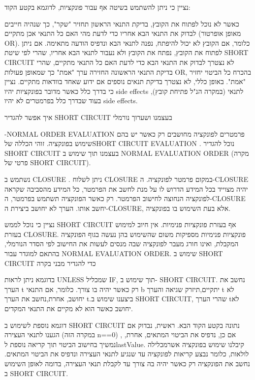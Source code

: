         נציין כי ניתן להשתמש בשיטה אף עבור פונקציות, לדוגמא בקטע הקוד:

        כאשר לא נוכל לפתוח את הקובץ, בדיקת התנאי הראשון תחזיר "שקר", כך שנהיה חייבים
        לבדוק את התנאי הבא אחריו כדי לדעת מהי האם כל התנאי אכן מתקיים (מאופן אופרטור
        OR). כלומר, אם הקובץ לא יכול להיפתח, נפנה לתנאי הבא ונדפיס הודעה מתאימה. אם
        ניתן לפתוח את הקובץ, נפתח את הקובץ ולא נעבור לתנאי הבא אחריו, שהרי לפי שיטת
        SHORT CIRCUIT לא נצטרך לבדוק את התנאי הבא כדי לדעת האם כל התנאי מתקיים, שהרי
        בדיקת התנאי הראשונה החזירה ערך "אמת" כך שמאופן פעולות OR, בהכרח כל הביטוי
        יחזיר "אמת". באופן כללי, לא נצטרך בדיקת תנאים נוספים אם ידוע שאחד בוודאות
        מתקיים. נציין כי בדרך כלל כאשר מדובר בפונקציות יהיו side effects לתנאי
        (במקרה הנ"ל פתיחת קובץ), בעוד שבדרך כלל בפרמטרים לא יהיו side effects.

        איך אפשר להגדיר SHORT CIRCUIT בעצמנו ושערוך נורמלי

        -NORMAL ORDER EVALUATION פרמטרים לפונקציה מחושבים רק כאשר יש בהם שימוש
        בפונקציה. זוהי הכללה שלSHORT CIRCUIT EVALUATION . נוכל להגדיר SHORT CIRCUIT
        בעצמנו תוך שימוש ב NORMAL EVALUATION ORDER (מקרה פרטי של SHORT CIRCUIT).

        נשתמש ב CLOSURE . ניתן לשלוח CLOSURE במקום פרמטר לפונקציה. ה-CLOSURE יהיה
        מצוייד בכל המידע הדרוש לו על מנת לחשב את הפרמטר, כל המידע מהסביבה שקראה
        לפונקציה הנחוצה לחישוב הפרמטר. רק כאשר הפונקציה תשתמש בפרמטר, ה-CLOSURE יחשב
        אותו. הערך לא יחושב ביצירת ה-CLOSURE, אלא בעת השימוש בו בפונקציה.

        נציין כי נוכל לממש SHORT CIRCUIT אף בעזרת פונקציות פנימיות. אין חיוב למימוש
        בעזרת CLOSURE. פונקציות פנימיות מספיקות משום שהשימוש בהן נעשה בגוף הפונקציה
        המקבלת, ואינו חורג מעבר לפונקציה שבה מנסים לעשות את החישוב לפי הסדר הנורמלי,
        בהתאם למוגדר עבור NORMAL EVALUATION ORDER. שימוש ב SHORT CIRCUIT כדי להגדיר
        מבני בקרה

        בדוגמא ניתן לראות UNLESS שמכליל IF, תוך שימוש ב- SHORT CIRCUIT. נחשב את הערך
        t רק כאשר יהיה בו צורך. כלומר, אם התנאי b יתקיים,תיזרק שגיאה והערך t לא יחושב,
        אחרת,נחשב את הערך t.ביצענו שימוש ב SHORT CIRCUIT, שהרי הערך tלא יחושב כאשר הוא
        לא מקיים את התנאי המקדים.

        דוגמא נוספת לשימוש ב SHORT CIRCUIT נתונה בקטע הקוד הבא. ראשית, נבדוק אם הגענו
        לתנאי העצירה (במקרה הזה n==0) , אם כן, נדפיס את הביטוי המתאים, אחרת, נמשיך
        בחישוב הביטוי תוך קריאה נוספת לlastValue. קיבלנו שימוש בפונקציה אשרמכלילה
        לולאות, כלומר נבצע קריאות לפונקציה עד שנגיע לתנאי העצירה ונדפיס את הביטוי
        המתאים. נחשב את הפונקציה רק כאשר יהיה בה צורך עד לקבלת תנאי העצירה, בדומה לאופן
        השימוש ב SHORT CIRCUIT.

